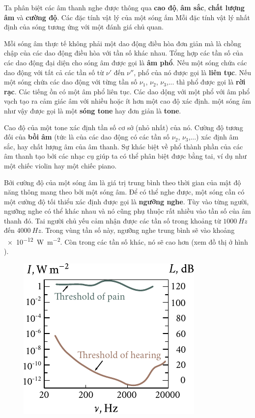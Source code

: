 Ta phân biệt các âm thanh nghe được thông qua \textbf{cao độ}, \textbf{âm sắc}, \textbf{chất lượng âm} và \textbf{cường độ}. Các đặc tính vật lý của một sóng ấm Mỗi đặc tính vật lý nhất định của sóng tương ứng với một đánh giá chủ quan.

Mỗi sóng âm thực tế không phải một dao động điều hòa đơn giản mà là chồng chập của các dao động điều hòa với tần số khác nhau. Tổng hợp các tần số của các dao động đại diện cho sóng âm được gọi là \textbf{âm phổ}. Nếu một sóng chứa các dao động với tất cả các tần số từ $\nu'$ đến $\nu''$, phổ của nó được gọi là \textbf{liên tục}. Nếu một sóng chứa các dao động với từng tần số $\nu_1$, $\nu_2$, $\nu_3$,... thì phổ được gọi là \textbf{rời rạc}. Các tiếng ồn có một âm phổ liên tục. Các dao dộng với một phổ với âm phổ vạch tạo ra cảm giác âm với nhiều hoặc ít hơn một cao độ xác định. một sóng âm như vậy được gọi là một \textbf{sóng tone} hay đơn giản là \textbf{tone}.

Cao độ của một tone xác định tần số cơ sở (nhỏ nhất) của nó. Cường độ tương đối của \textbf{bồi âm} (tức là của các dao động có các tần số $\nu_2$, $\nu_3$,...) xác định âm sắc, hay chất lượng âm của âm thanh. Sự khác biệt về phổ thành phần của các âm thanh tạo bởi các nhạc cụ giúp ta có thể phân biệt được bằng tai, ví dụ như một chiếc violin hay một chiếc piano.

Bởi cường độ của một sóng âm là giá trị trung bình theo thời gian của mật độ năng thông mang theo bởi một sóng âm. Để có thể nghe được, một sóng cần có một cường độ tối thiểu xác định được gọi là \textbf{ngưỡng nghe}. Tùy vào từng người, ngưỡng nghe có thể khác nhau và nó cũng phụ thuộc rất nhiều vào tần số của âm thanh đó. Tai người chủ yếu cảm nhận được các tần số trong khoảng từ $\SI{1000}{Hz}$ đến $\SI{4000}{Hz}$. Trong vùng tần số này, ngưỡng nghe trung bình sẽ vào khoảng \SI{e-12}{\watt\per\metre\squared}. Còn trong các tần số khác, nó sẽ cao hơn (xem đồ thị ở hình ).

\begin{figure}[!htb]
	\begin{center}
		\includegraphics[scale=1]{figures/ch_14/fig_14_13.pdf}
		\caption[]{}
		\label{fig:14_13}
	\end{center}
	\vspace{-0.8cm}
\end{figure}


